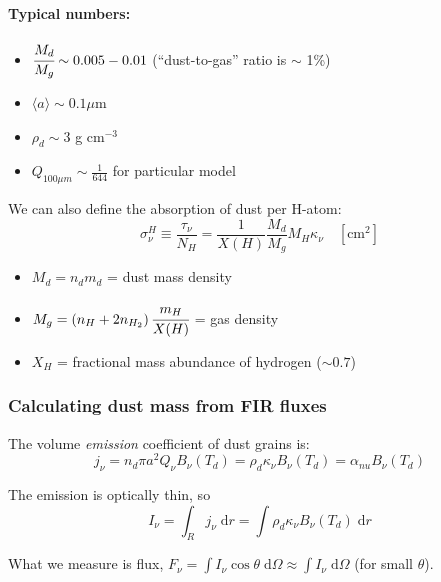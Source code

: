 \documentclass[11pt]{article}
\newcommand{\mar}[1]{\hspace{0pt}\marginpar{-\textcolor{black}{#1}-}}
\begin{document}
\paragraph{Typical numbers:}
\begin{itemize}[label={}, itemsep=1ex]
    \item $\cfrac{M_{d}}{M_{g}} \sim 0.005 - 0.01$
        (``dust-to-gas'' ratio is $\sim$ 1\%)
    \item $\langle a \rangle \sim 0.1 \mu$m
    \item $\rho_{d} \sim 3$ g cm$^{-3}$
    \item $Q_{100{\mu}m} \sim \frac{1}{644}$ for particular model
\end{itemize}
We can also define the absorption of dust per H-atom:
\[
    \sigma_{\nu}^{H}
    \equiv \frac{\tau_{\nu}}{N_{H}}
    = \frac{1}{X(H)} \frac{M_{d}}{M_{g}} M_{H} \kappa_{\nu} \quad
    [\mathrm{cm}^{2}]
    \]
\begin{itemize}[label={}, itemsep=1ex]
    \item $M_{d} = n_{d}m_{d}$ = dust mass density
    \item $M_{g} = \left( n_{H} + 2n_{H_{2}} \right)
        \cfrac{m_{H}}{X(H)}$ = gas density
    \item $X_{H}$ = fractional mass abundance of hydrogen ($ \sim 0.7 $)
\end{itemize}

\subsubsection{Calculating dust mass from FIR fluxes}
The volume \emph{emission} coefficient of dust grains is:
\[
    j_{\nu}
    = n_{d} \pi a^{2} Q_{\nu} B_{\nu} (T_{d})
    = \rho_{d} \kappa_{\nu} B_{\nu} (T_{d})
    = \alpha_{nu} B_{\nu} (T_{d})
    \]

\mar{107}The emission is optically thin, so
\[
    I_{\nu}
    = \int_{R}{
        j_{\nu} \;\mathrm{d}r}
    = \int{
        \rho_{d} \kappa_{\nu} B_{\nu} (T_{d}) \;\mathrm{d}r}
    \]

What we measure is flux,
$F_{\nu} = \int I_{\nu} \cos \theta \;\mathrm{d}\Omega
\approx \int I_{\nu} \;\mathrm{d}\Omega $ (for small $\theta$).
\end{document}
